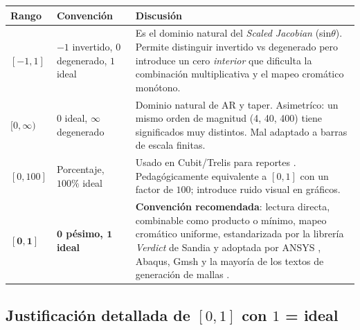 \documentclass[11pt,a4paper]{article}
\begin{document}
\begin{longtable}{p{2.6cm} p{4.2cm} p{8.5cm}}
\toprule
\textbf{Rango} & \textbf{Convenci\'on} & \textbf{Discusi\'on} \\
\midrule
\endhead
$[-1,1]$ & $-1$ invertido, $0$ degenerado, $1$ ideal & Es el dominio natural del \textit{Scaled
Jacobian} (sin$\theta$). Permite distinguir invertido vs degenerado pero introduce un cero
\emph{interior} que dificulta la combinaci\'on multiplicativa y el mapeo crom\'atico mon\'otono.\\
$[0,\infty)$ & $0$ ideal, $\infty$ degenerado & Dominio natural de AR y taper. Asimetr\'ico: un
mismo orden de magnitud (4, 40, 400) tiene significados muy distintos. Mal adaptado a barras de
escala finitas.\\
$[0,100]$ & Porcentaje, $100\%$ ideal & Usado en Cubit/Trelis para reportes \cite{Stimpson2007}.
Pedag\'ogicamente equivalente a $[0,1]$ con un factor de $100$; introduce ruido visual en
gr\'aficos.\\
\rowcolor{green!7}\textbf{$\bm{[0,1]}$} & \textbf{$\bm{0}$ p\'esimo, $\bm{1}$ ideal} & \textbf{Convenci\'on
recomendada}: lectura directa, combinable como producto o m\'inimo, mapeo crom\'atico uniforme,
estandarizada por la librer\'ia \textit{Verdict} de Sandia \cite{Stimpson2007} y adoptada por
ANSYS \cite{ANSYS2021}, Abaqus, Gmsh y la mayor\'ia de los textos de generaci\'on de mallas
\cite{Knupp2001,Field2000}.\\
\bottomrule
\end{longtable}

\subsection{Justificaci\'on detallada de $[0,1]$ con $1$ = ideal}
\end{document}
